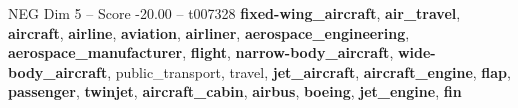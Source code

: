 \begin{textsample}{NEG Dim 5 – Score -20.00 – t007328}  \label{ex:f5_neg_012}
\textbf{fixed-wing\_aircraft}, \textbf{air\_travel}, \textbf{aircraft}, \textbf{airline}, \textbf{aviation}, \textbf{airliner}, \textbf{aerospace\_engineering}, \textbf{aerospace\_manufacturer}, \textbf{flight}, \textbf{narrow-body\_aircraft}, \textbf{wide-body\_aircraft}, public\_transport, travel, \textbf{jet\_aircraft}, \textbf{aircraft\_engine}, \textbf{flap}, \textbf{passenger}, \textbf{twinjet}, \textbf{aircraft\_cabin}, \textbf{airbus}, \textbf{boeing}, \textbf{jet\_engine}, \textbf{fin}

\end{textsample}
